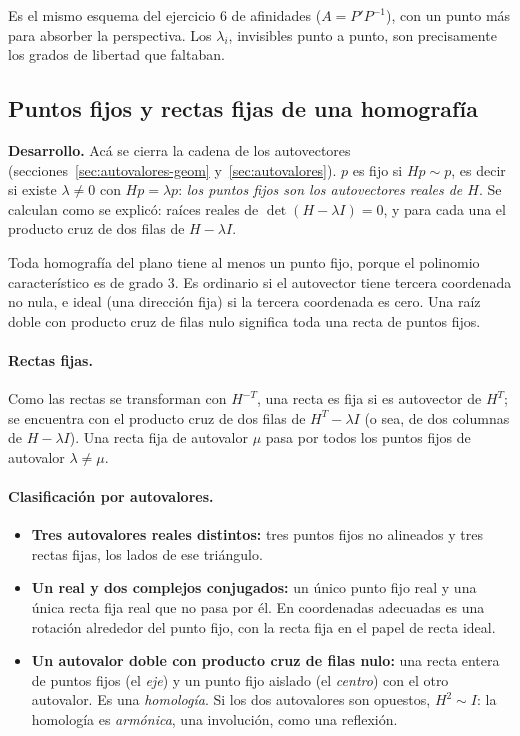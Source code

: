 Es el mismo esquema del ejercicio 6 de afinidades (\(A=P'P^{-1}\)), con un punto más para
absorber la perspectiva. Los \(\lambda_i\), invisibles punto a punto, son precisamente los
grados de libertad que faltaban.

\subsection{Puntos fijos y rectas fijas de una homografía}\label{sec:homografia-fijos}

\textbf{Desarrollo.} Acá se cierra la cadena de los autovectores (secciones~\ref{sec:autovalores-geom} y~\ref{sec:autovalores}). \(p\) es fijo si
\(Hp\sim p\), es decir si existe \(\lambda\neq0\) con \(Hp=\lambda p\): \emph{los puntos
fijos son los autovectores reales de \(H\)}. Se calculan como se explicó: raíces reales de
\(\det(H-\lambda I)=0\), y para cada una el producto cruz de dos filas de \(H-\lambda I\).

\begin{resultado}
Toda homografía del plano tiene al menos un punto fijo, porque el polinomio característico
es de grado \(3\). Es ordinario si el autovector tiene tercera coordenada no nula, e ideal
(una dirección fija) si la tercera coordenada es cero. Una raíz doble con producto cruz de
filas nulo significa toda una recta de puntos fijos.
\end{resultado}

\paragraph{Rectas fijas.} Como las rectas se transforman con \(H^{-T}\), una recta es fija
si es autovector de \(H^{T}\); se encuentra con el producto cruz de dos filas de
\(H^{T}-\lambda I\) (o sea, de dos columnas de \(H-\lambda I\)). Una recta fija de autovalor
\(\mu\) pasa por todos los puntos fijos de autovalor \(\lambda\neq\mu\).

\paragraph{Clasificación por autovalores.}
\begin{itemize}
  \item \textbf{Tres autovalores reales distintos:} tres puntos fijos no alineados y tres
  rectas fijas, los lados de ese triángulo.
  \item \textbf{Un real y dos complejos conjugados:} un único punto fijo real y una única
  recta fija real que no pasa por él. En coordenadas adecuadas es una rotación alrededor del
  punto fijo, con la recta fija en el papel de recta ideal.
  \item \textbf{Un autovalor doble con producto cruz de filas nulo:} una recta entera de
  puntos fijos (el \emph{eje}) y un punto fijo aislado (el \emph{centro}) con el otro
  autovalor. Es una \emph{homología}. Si los dos autovalores son opuestos, \(H^2\sim I\): la
  homología es \emph{armónica}, una involución, como una reflexión.
\end{itemize}

